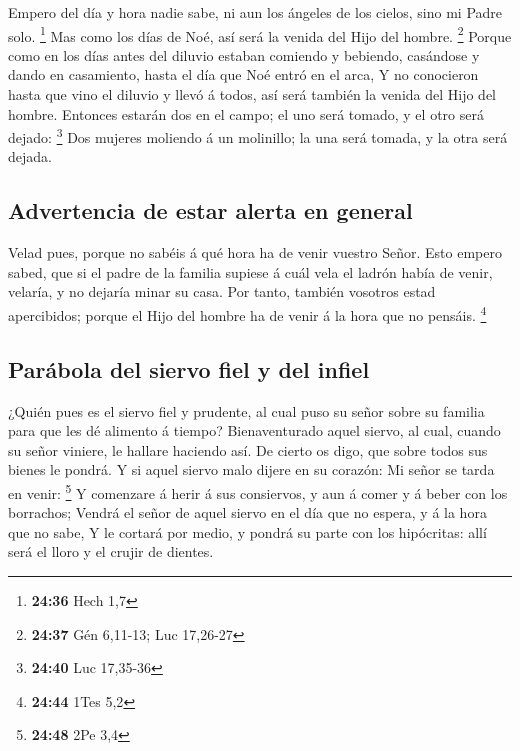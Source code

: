  Empero del día y hora nadie sabe, ni aun los ángeles de
los cielos, sino mi Padre solo. \footnote{\textbf{24:36} Hech 1,7}
 Mas como los días de Noé, así será la venida del Hijo del
hombre. \footnote{\textbf{24:37} Gén 6,11-13; Luc 17,26-27}
 Porque como en los días antes del diluvio estaban comiendo
y bebiendo, casándose y dando en casamiento, hasta el día que Noé entró
en el arca,  Y no conocieron hasta que vino el diluvio y
llevó á todos, así será también la venida del Hijo del hombre.
 Entonces estarán dos en el campo; el uno será tomado, y el
otro será dejado: \footnote{\textbf{24:40} Luc 17,35-36} 
Dos mujeres moliendo á un molinillo; la una será tomada, y la otra será
dejada.

\hypertarget{advertencia-de-estar-alerta-en-general}{%
\subsection{Advertencia de estar alerta en
general}\label{advertencia-de-estar-alerta-en-general}}

 Velad pues, porque no sabéis á qué hora ha de venir
vuestro Señor.  Esto empero sabed, que si el padre de la
familia supiese á cuál vela el ladrón había de venir, velaría, y no
dejaría minar su casa.  Por tanto, también vosotros estad
apercibidos; porque el Hijo del hombre ha de venir á la hora que no
pensáis. \footnote{\textbf{24:44} 1Tes 5,2}

\hypertarget{paruxe1bola-del-siervo-fiel-y-del-infiel}{%
\subsection{Parábola del siervo fiel y del
infiel}\label{paruxe1bola-del-siervo-fiel-y-del-infiel}}

 ¿Quién pues es el siervo fiel y prudente, al cual puso su
señor sobre su familia para que les dé alimento á tiempo? 
Bienaventurado aquel siervo, al cual, cuando su señor viniere, le
hallare haciendo así.  De cierto os digo, que sobre todos
sus bienes le pondrá.  Y si aquel siervo malo dijere en su
corazón: Mi señor se tarda en venir: \footnote{\textbf{24:48} 2Pe 3,4}
 Y comenzare á herir á sus consiervos, y aun á comer y á
beber con los borrachos;  Vendrá el señor de aquel siervo
en el día que no espera, y á la hora que no sabe,  Y le
cortará por medio, y pondrá su parte con los hipócritas: allí será el
lloro y el crujir de dientes.

